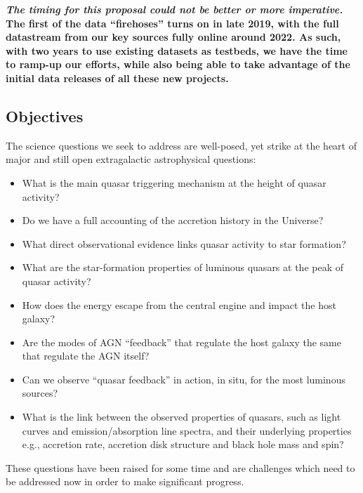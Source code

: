 \smallskip
\smallskip
\noindent
{\bf \emph{The timing for this proposal could not be better or more imperative.} 
The first of the data ``firehoses'' turns on in late 2019, with
the full datastream from our key sources fully online around 2022. 
As such, with two years to use existing datasets as testbeds, we 
have the time to ramp-up our efforts, while also being able to 
take advantage of the initial data releases of all these new projects.}


\subsection{Objectives}

\smallskip
\smallskip
\noindent
The science questions we seek to address are well-posed, yet strike at the heart of major and still
open extragalactic astrophysical questions: 
\begin{itemize}
\item What is the main quasar triggering mechanism at the height of quasar activity? 
\item Do we have a full accounting of the accretion history in the Universe?   
\item What direct observational evidence links quasar activity to star formation?  
\item What are the star-formation properties of luminous quasars at the peak of quasar activity? 
\item How does the energy escape from the central engine and impact the host galaxy?  
\item Are the modes of AGN ``feedback'' that regulate the host galaxy the same that regulate the AGN itself?  
\item Can we observe ``quasar feedback'' in action, in situ, for the most luminous sources?   
\item What is the link between the observed properties of quasars, such as light curves and emission/absorption line spectra, 
and their underlying properties e.g., accretion rate, accretion disk structure and black hole mass and spin? 
\end{itemize}

\smallskip
\smallskip
\noindent
These questions have been raised for some time and are challenges
which need to be addressed now in order to make significant progress.


